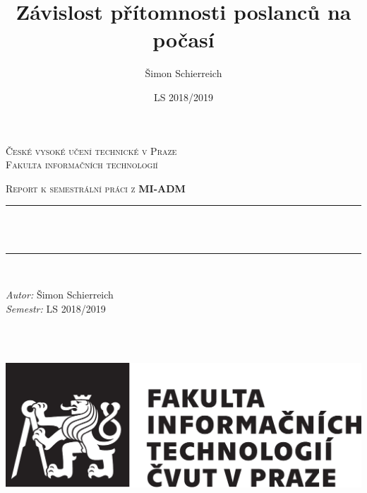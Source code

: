 \documentclass[12pt]{report}
\title{Závislost přítomnosti poslanců na počasí}
\author{Šimon Schierreich}
\date{LS 2018/2019}
\makeatletter
\let\thetitle\@title
\makeatother
\begin{document}

\begin{titlepage}
	\centering
    \vspace*{0.5 cm}
\begin{center}    \textsc{\Large   České vysoké učení technické v Praze\\Fakulta informačních technologií}\\[2.0 cm]	\end{center}%
	\textsc{\Large Report k semestrální práci z \textbf{MI-ADM}}\\[0.5 cm]				%
	\rule{\linewidth}{0.2 mm} \\[0.4 cm]
	{ \huge \bfseries \thetitle}\\
	\rule{\linewidth}{0.2 mm} \\[1.5 cm]
	
	\begin{minipage}{0.4\textwidth}
		\begin{flushleft} \large
			\emph{Autor:} Šimon Schierreich\\
			\emph{Semestr:} LS 2018/2019
			\end{flushleft}
			\end{minipage}~
			\begin{minipage}{0.4\textwidth}
            
			\begin{flushright} \large
		\end{flushright}
           
	\end{minipage}\\[7.2cm]
	
	\includegraphics[scale = 0.35]{logo_FIT_cb.pdf}
    
    
    
    
	
\end{titlepage}
\end{document}
